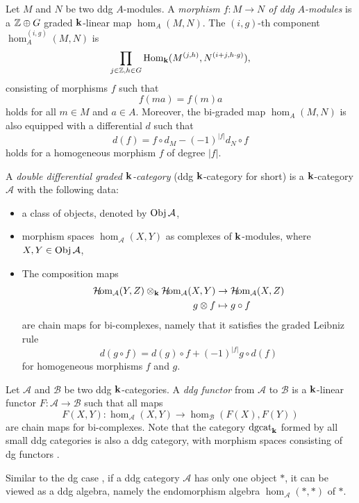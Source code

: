Let $M$ and $N$ be two ddg $A$-modules.
A \textit{morphism $f \colon M \to N$ of ddg $A$-modules}
is a $\mathbb{Z} \oplus G$ graded $\mathbf{k}$-linear map $\hom_A(M, N)$.
The $(i, g)$-th component $\hom^{(i, g)}_A(M, N)$ is
\[
  \prod_{j \in \mathbb{Z}, h \in G} \operatorname{Hom}_{\mathbf{k}}(M^{(j,h)}, N^{(i+j,h\cdot g)}),
\]
consisting of morphisms $f$ such that
\[ f(ma) = f(m)a \]
holds for all $m \in M$ and $a \in A$.
Moreover, the bi-graded map $\hom_A(M, N)$
is also equipped with a differential $d$ such that
\[ d(f) = f \circ d_M - (-1)^{|f|} d_N \circ f \]
holds for a homogeneous morphism $f$ of degree $|f|$.

\begin{definition}
  A \textit{double differential graded $\mathbf{k}$-category} (ddg $\mathbf{k}$-category for short)
  is a $\mathbf{k}$-category $\mathcal{A}$ with the following data:
  \begin{itemize}
    \item a class of objects, denoted by $\operatorname{Obj}{\mathcal{A}}$,
    \item morphism spaces $\hom_{\mathcal{A}}(X, Y)$ as complexes of $\mathbf{k}$-modules,
      where $X, Y \in \operatorname{Obj}{\mathcal{A}}$,
    \item The composition maps
      \begin{align*}
        \operatorname{\mathcal{H}\!om}_{\mathcal{A}}(Y, Z) \otimes_{\mathbf{k}} \operatorname{\mathcal{H}\!om}_{\mathcal{A}}(X, Y)
        & \to \operatorname{\mathcal{H}\!om}_{\mathcal{A}}(X, Z)\\
        g \otimes f &\mapsto g \circ f
      \end{align*}
      are chain maps for bi-complexes,
      namely that it satisfies the graded Leibniz rule
      \[ d(g \circ f) = d(g)\circ f + (-1)^{|f|}g \circ d(f) \]
      for homogeneous morphisms $f$ and $g$.
  \end{itemize}
\end{definition}

Let $\mathcal{A}$ and $\mathcal{B}$ be two ddg $\mathbf{k}$-categories.
A \textit{ddg functor} from $\mathcal{A}$ to $\mathcal{B}$ is a $\mathbf{k}$-linear functor
$F \colon \mathcal{A} \to \mathcal{B}$ such that all maps
\[ F(X,Y) \colon \hom_{\mathcal{A}}(X, Y) \to \hom_{\mathcal{B}}(F(X), F(Y)) \]
are chain maps for bi-complexes.
Note that the category $\operatorname{dgcat}_{\mathbf{k}}$ formed by all small ddg categories
is also a ddg category, 
with morphism spaces consisting of dg functors \cite{K7}.
\begin{remark}
  Similar to the dg case \cite{K7},
  if a ddg category $\mathcal{A}$ has only one object $*$,
  it can be viewed as a ddg algebra,
  namely the endomorphism algebra $\hom_{\mathcal{A}}(*, *)$ of $*$.
\end{remark}

